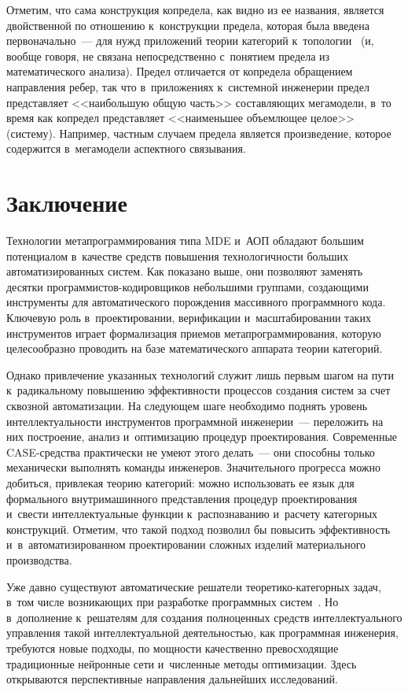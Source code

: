 \begin{multicols}{2}
   Отметим, что сама конструкция копредела, как видно из ее названия, 
является двойственной по отношению к~конструкции предела, которая была 
введена первоначально~--- для нужд приложений тео\-рии категорий 
к~топологии~\cite{11-kov} (и, вообще говоря, не связана непосредственно 
с~понятием предела из математического анализа). Предел отличается от 
копредела обращением направления ребер, так что в~приложениях к~системной 
инженерии предел представляет <<наибольшую общую часть>> составляющих 
мегамодели, в~то время как копредел представляет <<наименьшее объемлющее 
целое>> (систему). Например, частным случаем предела является 
произведение, которое содержится в~мегамодели аспектного связывания.

\section{Заключение}

   Технологии метапрограммирования типа MDE и~АОП обладают большим 
потенциалом в~качестве средств повышения технологичности больших 
автоматизированных систем. Как показано выше, они позволяют заменять 
десятки про\-грам\-ми\-стов-ко\-ди\-ров\-щи\-ков небольшими группами, 
создающими инструменты для автоматического порождения массивного 
программного кода. Ключевую роль в~проектировании, верификации 
и~масштабировании таких инструментов играет формализация приемов 
метапрограммирования, которую целесообразно проводить на базе 
математического аппарата теории категорий.
   
   Однако привлечение указанных технологий служит лишь первым шагом на 
пути к~радикальному повышению эффективности процессов создания систем за 
счет сквозной автоматизации. На следующем шаге необходимо поднять 
уровень интеллектуальности инструментов программной инженерии~--- 
переложить на них построение, анализ и~оптимизацию процедур 
проектирования. Современные CASE-сред\-ст\-ва практически не умеют этого 
делать~--- они способны только механически выполнять команды инженеров. 
Значительного прогресса можно добиться, привлекая теорию категорий: можно 
использовать ее язык для формального внутримашинного представления 
процедур проектирования и~свести интеллектуальные функции 
к~распознаванию и~расчету категорных конструкций. Отметим, что такой 
подход позволил бы повысить эффективность и~в~автоматизированном 
проектировании сложных изделий материального производства.
   
   Уже давно существуют автоматические решатели  
тео\-ре\-ти\-ко-ка\-те\-гор\-ных задач, в~том числе возникающих при разработке 
программных систем~\cite{35-kov}. Но в~дополнение к~решателям для создания 
полноценных средств интеллектуального управления такой интеллектуальной 
деятельностью, как программная инженерия, требуются новые подходы, по 
мощности качественно превосходящие традиционные нейронные сети 
и~численные методы оптимизации. Здесь открываются перспективные 
направления дальнейших исследований.
   

\end{multicols}
